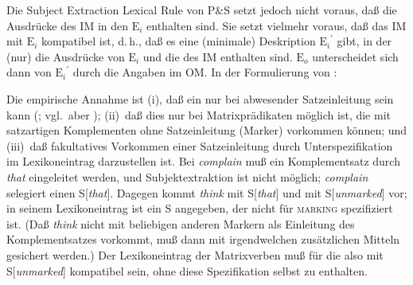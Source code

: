 \documentclass[output=paper]{LSP/langsci}
\begin{document}
\randnum\label{rn:17-48}Die Subject Extraction Lexical Rule von P\&S setzt jedoch
nicht voraus, daß die Ausdrücke des IM in den $\mathrm{E}_i$ enthalten
sind. Sie setzt vielmehr voraus, daß das IM mit $\mathrm{E}_i$
kompatibel ist, d.\,h., daß es eine (minimale) Deskription
${\mathrm{E}_i}^{\prime}$ gibt, in der (nur) die Ausdrücke von
$\mathrm{E}_i$ und die des IM enthalten
sind. $\mathrm{E}_o$ unterscheidet sich dann von
${\mathrm{E}_i}^{\prime}$ durch die Angaben im OM. In der Formulierung
von \citet[383 (69)]{PollardSag1994}:
\begin{exe}
  \ex\label{rn:17-49}
\end{exe}

\addlines
\randnum\label{rn:17-50}Die empirische Annahme ist (i), daß ein  nur bei
abwesender Satzeinleitung  sein kann
(; vgl.\ aber \citealt{culicover1993a}); (ii)~daß dies
nur bei Matrixprädikaten möglich ist, die mit satzartigen Komplementen
ohne Satzeinleitung (Marker) vorkommen können; und (iii)~daß
fakultatives Vorkommen einer Satzeinleitung durch Unterspezifikation
im Lexikoneintrag darzustellen ist. Bei \textit{complain} \zb muß ein
Komplementsatz durch \textit{that} eingeleitet werden, und
Subjektextraktion ist nicht möglich; \textit{complain} selegiert einen
S[\textit{that}]. Dagegen kommt \textit{think} mit S[\textit{that}]
und mit S[\textit{unmarked}] vor; in seinem Lexikoneintrag ist ein S
angegeben, der nicht für \textsc{marking} spezifiziert ist. (Daß
\textit{think} nicht mit beliebigen anderen Markern als Einleitung des
Komplementsatzes vorkommt, muß dann mit irgendwelchen zusätzlichen
Mitteln gesichert werden.) Der Lexikoneintrag der Matrixverben muß für
die  also mit S[\textit{unmarked}] kompatibel sein, ohne
diese Spezifikation selbst zu enthalten.
\end{document}
